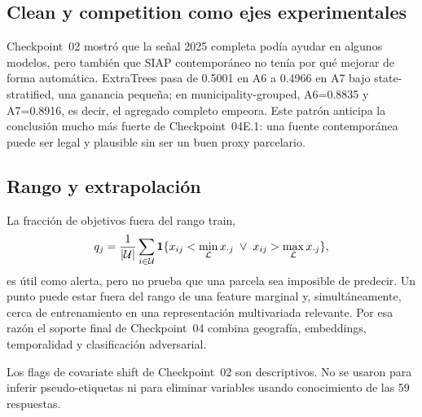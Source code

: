 \subsection{Clean y competition como ejes experimentales}

Checkpoint~02 mostró que la señal 2025 completa podía ayudar en algunos modelos, pero también
que SIAP contemporáneo no tenía por qué mejorar de forma automática. ExtraTrees pasa de
0.5001 en A6 a 0.4966 en A7 bajo state-stratified, una ganancia pequeña; en
municipality-grouped, A6=0.8835 y A7=0.8916, es decir, el agregado completo empeora. Este
patrón anticipa la conclusión mucho más fuerte de Checkpoint~04E.1: una fuente contemporánea
puede ser legal y plausible sin ser un buen proxy parcelario.

\subsection{Rango y extrapolación}

La fracción de objetivos fuera del rango train,
\[
q_j=
\frac{1}{|\mathcal{U}|}
\sum_{i\in\mathcal{U}}
\mathbf 1\{x_{ij}<\min_{\mathcal{L}}x_{\cdot j}\;\vee\;
x_{ij}>\max_{\mathcal{L}}x_{\cdot j}\},
\]
es útil como alerta, pero no prueba que una parcela sea imposible de predecir. Un punto puede
estar fuera del rango de una feature marginal y, simultáneamente, cerca de entrenamiento en
una representación multivariada relevante. Por esa razón el soporte final de Checkpoint~04
combina geografía, embeddings, temporalidad y clasificación adversarial.

\begin{technicalnote}
Los flags de covariate shift de Checkpoint~02 son descriptivos. No se usaron para inferir
pseudo-etiquetas ni para eliminar variables usando conocimiento de las 59 respuestas.
\end{technicalnote}
